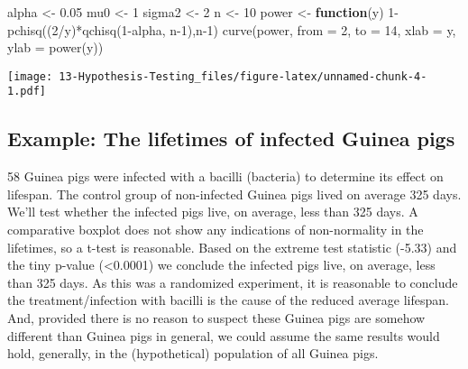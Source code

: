 \documentclass[
]{book}
\newenvironment{Shaded}{\begin{snugshade}}{\end{snugshade}}
\newcommand{\AttributeTok}[1]{\textcolor[rgb]{0.77,0.63,0.00}{#1}}
\newcommand{\ControlFlowTok}[1]{\textcolor[rgb]{0.13,0.29,0.53}{\textbf{#1}}}
\newcommand{\DecValTok}[1]{\textcolor[rgb]{0.00,0.00,0.81}{#1}}
\newcommand{\FloatTok}[1]{\textcolor[rgb]{0.00,0.00,0.81}{#1}}
\newcommand{\FunctionTok}[1]{\textcolor[rgb]{0.00,0.00,0.00}{#1}}
\newcommand{\NormalTok}[1]{#1}
\newcommand{\OtherTok}[1]{\textcolor[rgb]{0.56,0.35,0.01}{#1}}
\newcommand{\SpecialCharTok}[1]{\textcolor[rgb]{0.00,0.00,0.00}{#1}}
\newcommand{\StringTok}[1]{\textcolor[rgb]{0.31,0.60,0.02}{#1}}
\begin{document}
\begin{Shaded}
\begin{Highlighting}[]
\NormalTok{alpha }\OtherTok{\textless{}{-}} \FloatTok{0.05}
\NormalTok{mu0 }\OtherTok{\textless{}{-}} \DecValTok{1}
\NormalTok{sigma2 }\OtherTok{\textless{}{-}} \DecValTok{2}
\NormalTok{n }\OtherTok{\textless{}{-}} \DecValTok{10}
\NormalTok{power }\OtherTok{\textless{}{-}} \ControlFlowTok{function}\NormalTok{(y)  }\DecValTok{1}\SpecialCharTok{{-}}\FunctionTok{pchisq}\NormalTok{((}\DecValTok{2}\SpecialCharTok{/}\NormalTok{y)}\SpecialCharTok{*}\FunctionTok{qchisq}\NormalTok{(}\DecValTok{1}\SpecialCharTok{{-}}\NormalTok{alpha, n}\DecValTok{{-}1}\NormalTok{),n}\DecValTok{{-}1}\NormalTok{)}
\FunctionTok{curve}\NormalTok{(power, }\AttributeTok{from =} \DecValTok{2}\NormalTok{, }\AttributeTok{to =} \DecValTok{14}\NormalTok{, }\AttributeTok{xlab =} \StringTok{\textquotesingle{}y\textquotesingle{}}\NormalTok{, }\AttributeTok{ylab =} \StringTok{\textquotesingle{}power(y)\textquotesingle{}}\NormalTok{)  }
\end{Highlighting}
\end{Shaded}

\texttt{[image: 13-Hypothesis-Testing\_files/figure-latex/unnamed-chunk-4-1.pdf]}

\hypertarget{example-the-lifetimes-of-infected-guinea-pigs}{%
\subsection{Example: The lifetimes of infected Guinea pigs}\label{example-the-lifetimes-of-infected-guinea-pigs}}

58 Guinea pigs were infected with a bacilli (bacteria) to determine its effect on lifespan. The control group of non-infected Guinea pigs lived on average 325 days. We'll test whether the infected pigs live, on average, less than 325 days. A comparative boxplot does not show any indications of non-normality in the lifetimes, so a t-test is reasonable. Based on the extreme test statistic (-5.33) and the tiny p-value (\textless0.0001) we conclude the infected pigs live, on average, less than 325 days. As this was a randomized experiment, it is reasonable to conclude the treatment/infection with bacilli is the cause of the reduced average lifespan. And, provided there is no reason to suspect these Guinea pigs are somehow different than Guinea pigs in general, we could assume the same results would hold, generally, in the (hypothetical) population of all Guinea pigs.
\end{document}

